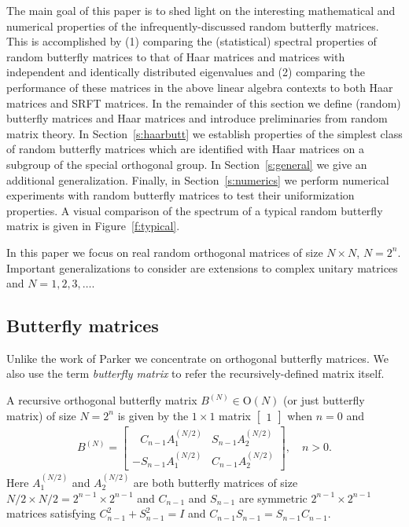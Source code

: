 The main goal of this paper is to shed light on the interesting mathematical and numerical properties of the infrequently-discussed random butterfly matrices.  This is accomplished by (1) comparing the (statistical) spectral properties of random butterfly matrices to that of Haar matrices and matrices with independent and identically distributed eigenvalues and (2) comparing the performance of these matrices in the above linear algebra contexts to both Haar matrices and SRFT matrices.  In the remainder of this section we define (random) butterfly matrices and Haar matrices and introduce preliminaries from random matrix theory.  In Section~\ref{s:haarbutt} we establish properties of the simplest class of random butterfly matrices which are identified with Haar matrices on a subgroup of the special orthogonal group. In Section~\ref{s:general} we give an additional generalization.  Finally, in Section~\ref{s:numerics} we perform numerical experiments with random butterfly matrices to test their uniformization properties.  A visual comparison of the spectrum of a typical random butterfly matrix is given in Figure~\ref{f:typical}.

\begin{remark}
In this paper we focus on real random orthogonal matrices of size $N \times N$, $N = 2^n$.  Important generalizations to consider are extensions to complex unitary matrices and $N = 1,2,3,\ldots$.
\end{remark}

\subsection{Butterfly matrices}\label{s:butterfly}

Unlike the work of Parker \cite{Parker1995} we concentrate on orthogonal butterfly matrices.  We also use the term \emph{butterfly matrix} to refer the recursively-defined matrix itself.
\newcommand{\pp}[1]{^{(#1)}}

\begin{definition}
A recursive orthogonal butterfly matrix $B^{(N)} \in \mathrm{O}(N)$ (or just butterfly matrix) of size $N = 2^n$ is given by the $1\times 1$ matrix $\begin{bmatrix} 1 \end{bmatrix}$ when $n = 0$ and
\begin{align}\label{e:buttdef}
B ^{(N)} = \begin{bmatrix} \phantom{.}~~C_{n-1} A_1^{(N/2)}  & S_{n-1} A_2^{(N/2)}  \\ - S_{n-1} A_1 ^{(N/2)}  & C_{n-1} A_2^{(N/2)}  \end{bmatrix}, \quad n > 0.
\end{align} 
Here $A_1^{(N/2)}$ and $A_2^{(N/2)}$ are both butterfly matrices of size $N/2 \times N/2 = 2^{n-1} \times 2^{n-1}$ and $C_{n-1}$ and $S_{n-1}$ are symmetric $2^{n-1}\times 2^{n-1}$ matrices satisfying $C_{n-1}^2 + S_{n-1}^2 = I$ and $C_{n-1}S_{n-1} = S_{n-1}C_{n-1}$.
\end{definition}

